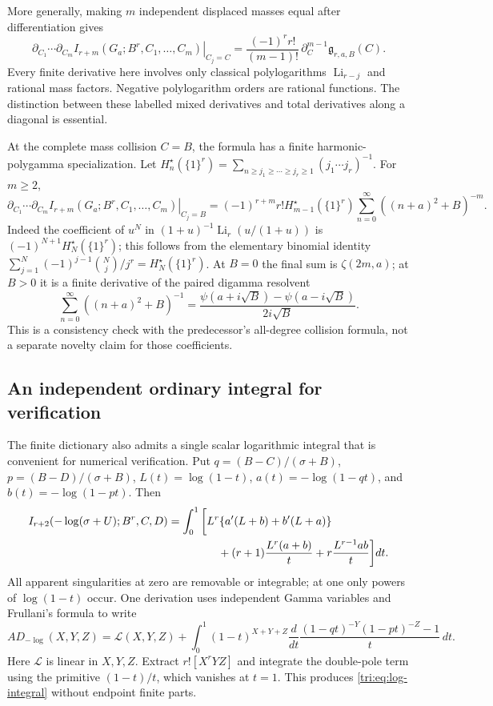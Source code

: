 More generally, making $m$ independent displaced masses equal
after differentiation gives
\begin{equation}\label{tri:eq:confluent}
 \left.\partial_{C_1}\cdots\partial_{C_m}
 I_{r+m}(G_a;B^r,C_1,\ldots,C_m)\right|_{C_j=C}
 =\frac{(-1)^r r!}{(m-1)!}\,
                    \partial_C^{m-1}\mathfrak g_{r,a,B}(C).
\end{equation}
Every finite derivative here involves only classical polylogarithms
$\operatorname{Li}_{r-j}$ and rational mass factors. Negative
polylogarithm orders are rational functions. The distinction
between these labelled mixed derivatives and total derivatives
along a diagonal is essential.

At the complete mass collision $C=B$, the formula has a finite
harmonic-polygamma specialization. Let
$H_n^\star(\{1\}^r)=\sum_{n\ge j_1\ge\cdots\ge j_r\ge1}
(j_1\cdots j_r)^{-1}$. For $m\ge2$,
\begin{equation}\label{tri:eq:complete-collision}
 \left.\partial_{C_1}\cdots\partial_{C_m}
 I_{r+m}(G_a;B^r,C_1,\ldots,C_m)\right|_{C_j=B}
 =(-1)^{r+m}r!H_{m-1}^\star(\{1\}^r)
             \sum_{n=0}^{\infty}((n+a)^2+B)^{-m}.
\end{equation}
Indeed the coefficient of $u^N$ in
$(1+u)^{-1}\operatorname{Li}_r(u/(1+u))$ is
$(-1)^{N+1}H_N^\star(\{1\}^r)$; this follows from the elementary
binomial identity
$\sum_{j=1}^N(-1)^{j-1}\binom Nj/j^r=H_N^\star(\{1\}^r)$.
At $B=0$ the final sum is $\zeta(2m,a)$; at $B>0$ it is a
finite derivative of the paired digamma resolvent
\[
 \sum_{n=0}^{\infty}((n+a)^2+B)^{-1}
  =\frac{\psi(a+i\sqrt B)-\psi(a-i\sqrt B)}{2i\sqrt B}.
\]
This is a consistency check with the predecessor's all-degree
collision formula, not a separate novelty claim for those
coefficients.

\subsection{An independent ordinary integral for verification}

The finite dictionary also admits a single scalar logarithmic
integral that is convenient for numerical verification. Put
$q=(B-C)/(\sigma+B)$, $p=(B-D)/(\sigma+B)$,
$L(t)=\log(1-t)$, $a(t)=-\log(1-qt)$, and
$b(t)=-\log(1-pt)$. Then
\begin{align}\label{tri:eq:log-integral}
 I_{r+2}(-\log(\sigma+U);B^r,C,D)
  =\int_0^1\bigg[&L^r\{a'(L+b)+b'(L+a)\}\notag\\
       &\quad +(r+1)\frac{L^r(a+b)}t
       +r\frac{L^{r-1}ab}t\bigg]dt.
\end{align}
All apparent singularities at zero are removable or integrable;
at one only powers of $\log(1-t)$ occur. One derivation uses
independent Gamma variables and Frullani's formula to write
\[
 A D_{-\log}(X,Y,Z)
   =\mathcal L(X,Y,Z)
     +\int_0^1(1-t)^{X+Y+Z}
       \frac{d}{dt}\frac{(1-qt)^{-Y}(1-pt)^{-Z}-1}{t}\,dt.
\]
Here $\mathcal L$ is linear in $X,Y,Z$.
Extract $r![X^rYZ]$ and integrate the double-pole term using
the primitive $(1-t)/t$, which vanishes at $t=1$.
This produces \eqref{tri:eq:log-integral} without endpoint
finite parts.

